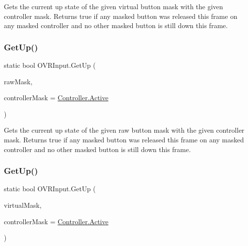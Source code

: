 Gets the current up state of the given virtual button mask with the given controller mask. Returns true if any masked button was released this frame on any masked controller and no other masked button is still down this frame. 

\mbox{\label{class_o_v_r_input_a4dd206208ab9835257a2495e92f41f71}} 
\subsubsection{\texorpdfstring{Get\+Up()}{GetUp()}\hspace{0.1cm}{\footnotesize\ttfamily [2/6]}}
{\footnotesize\ttfamily static bool O\+V\+R\+Input.\+Get\+Up (\begin{DoxyParamCaption}\item[{\mbox{\hyperlink{class_o_v_r_input_a9d6423af820e22b93f0b33a4fc4bf77a}{Raw\+Button}}}]{raw\+Mask,  }\item[{\mbox{\hyperlink{class_o_v_r_input_a5c86f9052a9cbb0b73779ff5704d60a8}{Controller}}}]{controller\+Mask = {\ttfamily \mbox{\hyperlink{class_o_v_r_input_a5c86f9052a9cbb0b73779ff5704d60a8a4d3d769b812b6faa6b76e1a8abaece2d}{Controller.\+Active}}} }\end{DoxyParamCaption})\hspace{0.3cm}{\ttfamily [static]}}



Gets the current up state of the given raw button mask with the given controller mask. Returns true if any masked button was released this frame on any masked controller and no other masked button is still down this frame. 

\mbox{\label{class_o_v_r_input_a70c67e065dffb7d2ea3cfbb67944a0ea}} 
\subsubsection{\texorpdfstring{Get\+Up()}{GetUp()}\hspace{0.1cm}{\footnotesize\ttfamily [3/6]}}
{\footnotesize\ttfamily static bool O\+V\+R\+Input.\+Get\+Up (\begin{DoxyParamCaption}\item[{\mbox{\hyperlink{class_o_v_r_input_a4e1f1eb856223383aefc1965dd2db39a}{Touch}}}]{virtual\+Mask,  }\item[{\mbox{\hyperlink{class_o_v_r_input_a5c86f9052a9cbb0b73779ff5704d60a8}{Controller}}}]{controller\+Mask = {\ttfamily \mbox{\hyperlink{class_o_v_r_input_a5c86f9052a9cbb0b73779ff5704d60a8a4d3d769b812b6faa6b76e1a8abaece2d}{Controller.\+Active}}} }\end{DoxyParamCaption})\hspace{0.3cm}{\ttfamily [static]}}



